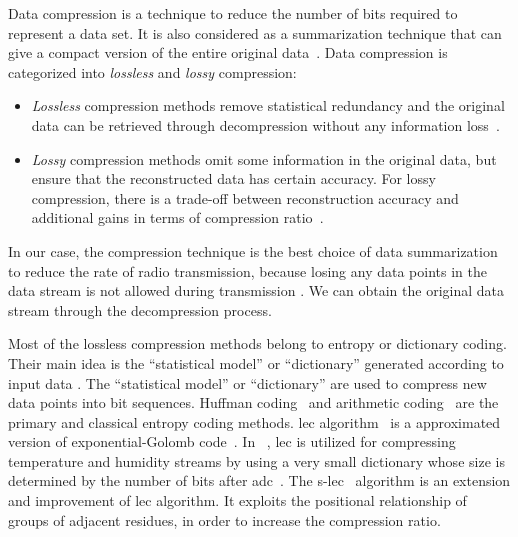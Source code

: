 Data compression is a technique to reduce the number of bits required to
represent a data set. It is also considered as a summarization technique
that can give a compact version of the entire original
data~\cite{hesabi2015data}. Data compression is categorized into
\emph{lossless} and \emph{lossy} compression:
\begin{itemize}
    \item \emph{Lossless} compression methods remove statistical redundancy and
    the original data can be retrieved through decompression without any
    information loss~\cite{hesabi2015data}.
    \item \emph{Lossy} compression methods omit some information in the original
    data, but ensure that the reconstructed data has certain accuracy. For lossy
    compression, there is a trade-off between reconstruction accuracy and
    additional gains in terms of compression ratio~\cite{zordan2014performance}.
\end{itemize}

In our case, the compression technique is the best choice of data summarization
to reduce the rate of radio transmission, because losing any data points in the
data stream is not allowed during transmission . We can obtain the original data
stream through the decompression process. 

Most of the lossless compression methods belong to entropy or dictionary coding. Their main idea 
is the ``statistical model'' or ``dictionary''
generated according to input data .
The ``statistical model'' or ``dictionary''
are used to compress new data points into  bit sequences. Huffman
coding~\cite{huffman1952method} and arithmetic
coding~\cite{langdon1984introduction} are the primary and classical entropy
coding methods. \acrfull{lec} algorithm~\cite{marcelloni2008simple} is a
approximated version of exponential-Golomb code~\cite{teuhola1978compression}.
In ~\cite{marcelloni2008simple}, \acrshort{lec} is utilized for compressing
temperature and humidity streams by using a very small dictionary whose size is
determined by the number of bits after
\acrfull{adc}~\cite{marcelloni2008simple,marcelloni2009efficient}. The
\acrfull{s-lec}~\cite{li2016temporal} algorithm is an extension and improvement
of \acrshort{lec} algorithm. It exploits the positional relationship of groups
of adjacent residues, in order to increase the compression ratio.

